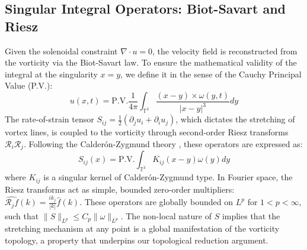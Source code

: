 \documentclass[12pt,a4paper]{article}
\theoremstyle{plain}
\theoremstyle{definition}
\theoremstyle{remark}
\begin{document}
\subsection{Singular Integral Operators: Biot-Savart and Riesz}
Given the solenoidal constraint $\nabla \cdot u = 0$, the velocity field is reconstructed from the vorticity via the Biot-Savart law. To ensure the mathematical validity of the integral at the singularity $x=y$, we define it in the sense of the Cauchy Principal Value (P.V.):
\begin{equation}
    u(x,t) = \text{P.V.} \frac{1}{4\pi} \int_{\mathbb{T}^3} \frac{(x-y) \times \omega(y,t)}{|x-y|^3} dy
\end{equation}
The rate-of-strain tensor $S_{ij} = \frac{1}{2}(\partial_j u_i + \partial_i u_j)$, which dictates the stretching of vortex lines, is coupled to the vorticity through second-order Riesz transforms $\mathcal{R}_i \mathcal{R}_j$. Following the Calderón-Zygmund theory \cite{calderon1952}, these operators are expressed as:
\begin{equation}
    S_{ij}(x) = \text{P.V.} \int_{\mathbb{T}^3} K_{ij}(x-y) \omega(y) dy
\end{equation}
where $K_{ij}$ is a singular kernel of Calderón-Zygmund type. In Fourier space, the Riesz transforms act as simple, bounded zero-order multipliers: $\widehat{\mathcal{R}_j f}(k) = \frac{i k_j}{|k|} \hat{f}(k)$. These operators are globally bounded on $L^p$ for $1 < p < \infty$, such that $\|S\|_{L^p} \leq C_p \|\omega\|_{L^p}$. The non-local nature of $S$ implies that the stretching mechanism at any point is a global manifestation of the vorticity topology, a property that underpins our topological reduction argument.
\end{document}
